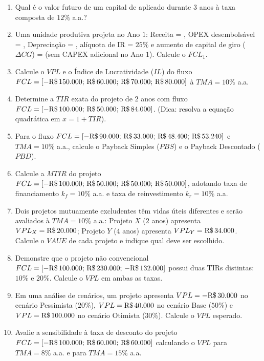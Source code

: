 \begin{enumerate}[leftmargin=1.6em, itemsep=5pt]
  \item Qual é o valor futuro de um capital de  aplicado durante $3$ anos à taxa composta de $12\%$ a.a.? \espacoResolucao[1.5cm]
  \item Uma unidade produtiva projeta no Ano $1$: Receita = , OPEX desembolsável = , Depreciação = , alíquota de IR = $25\%$ e aumento de capital de giro ($\Delta CG$) =  (sem CAPEX adicional no Ano $1$). Calcule o $FCL_1$. \espacoResolucao[1.8cm]
  \item Calcule o $VPL$ e o Índice de Lucratividade ($IL$) do fluxo $FCL = [-\text{R\$\,}{150.000};\, \text{R\$\,}{60.000};\, \text{R\$\,}{70.000};\, \text{R\$\,}{80.000}]$ à $TMA = 10\%$ a.a. \espacoResolucao[1.8cm]
  \item Determine a $TIR$ exata do projeto de $2$ anos com fluxo $FCL = [-\text{R\$\,}{100.000};\, \text{R\$\,}{50.000};\, \text{R\$\,}{84.000}]$. (Dica: resolva a equação quadrática em $x = 1 + TIR$). \espacoResolucao[1.8cm]
  \item Para o fluxo $FCL = [-\text{R\$\,}{90.000};\, \text{R\$\,}{33.000};\, \text{R\$\,}{48.400};\, \text{R\$\,}{53.240}]$ e $TMA = 10\%$ a.a., calcule o Payback Simples ($PBS$) e o Payback Descontado ($PBD$). \espacoResolucao[1.8cm]
  \item Calcule a $MTIR$ do projeto $FCL = [-\text{R\$\,}{100.000};\, \text{R\$\,}{50.000};\, \text{R\$\,}{50.000};\, \text{R\$\,}{50.000}]$, adotando taxa de financiamento $k_f = 10\%$ a.a. e taxa de reinvestimento $k_r = 10\%$ a.a. \espacoResolucao[1.8cm]
  \item Dois projetos mutuamente excludentes têm vidas úteis diferentes e serão avaliados à $TMA = 10\%$ a.a.: Projeto $X$ ($2$ anos) apresenta $VPL_X = \text{R\$\,}{20.000}$; Projeto $Y$ ($4$ anos) apresenta $VPL_Y = \text{R\$\,}{34.000}$. Calcule o $VAUE$ de cada projeto e indique qual deve ser escolhido. \espacoResolucao[1.8cm]
  \item Demonstre que o projeto não convencional $FCL = [-\text{R\$\,}{100.000};\, \text{R\$\,}{230.000};\, -\text{R\$\,}{132.000}]$ possui duas TIRs distintas: $10\%$ e $20\%$. Calcule o $VPL$ em ambas as taxas. \espacoResolucao[1.7cm]
  \item Em uma análise de cenários, um projeto apresenta $VPL = -\text{R\$\,}{30.000}$ no cenário Pessimista ($20\%$), $VPL = \text{R\$\,}{40.000}$ no cenário Base ($50\%$) e $VPL = \text{R\$\,}{100.000}$ no cenário Otimista ($30\%$). Calcule o $VPL$ esperado. \espacoResolucao[1.6cm]
  \item Avalie a sensibilidade à taxa de desconto do projeto $FCL = [-\text{R\$\,}{100.000};\, \text{R\$\,}{60.000};\, \text{R\$\,}{60.000}]$ calculando o $VPL$ para $TMA = 8\%$ a.a. e para $TMA = 15\%$ a.a. \espacoResolucao[1.7cm]

\end{enumerate}

